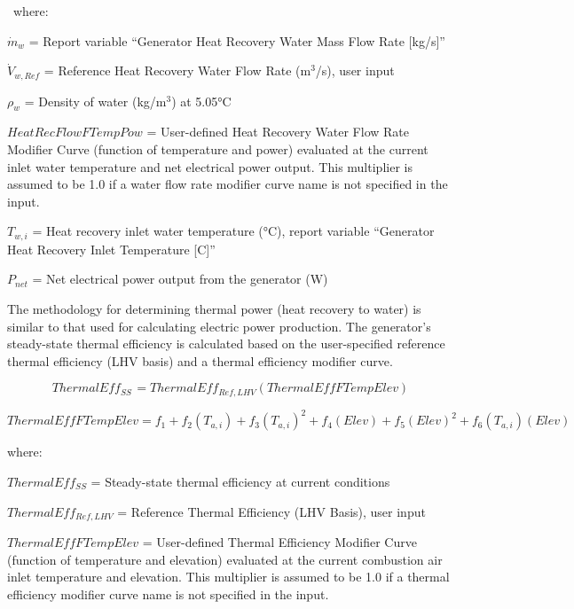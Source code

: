~where:

\({\dot m_w}\) = Report variable ``Generator Heat Recovery Water Mass Flow Rate {[}kg/s{]}''

\({\dot V_{w,Ref}}\) = Reference Heat Recovery Water Flow Rate (m\(^{3}\)/s), user input

\({\rho_w}\) = Density of water (kg/m\(^{3}\)) at 5.05°C

\(HeatRecFlowFTempPow\) = User-defined Heat Recovery Water Flow Rate Modifier Curve (function of temperature and power) evaluated at the current inlet water temperature and net electrical power output. This multiplier is assumed to be 1.0 if a water flow rate modifier curve name is not specified in the input.

\({T_{w,i}}\) = Heat recovery inlet water temperature (°C), report variable ``Generator Heat Recovery Inlet Temperature {[}C{]}''

\({P_{net}}\) = Net electrical power output from the generator (W)

The methodology for determining thermal power (heat recovery to water) is similar to that used for calculating electric power production. The generator's steady-state thermal efficiency is calculated based on the user-specified reference thermal efficiency (LHV basis) and a thermal efficiency modifier curve.

\begin{equation}
ThermalEf{f_{SS\,}} = ThermalEf{f_{Ref,LHV}}\left( {ThermalEffFTempElev} \right)
\end{equation}

\begin{equation}
ThermalEffFTempElev = {f_1} + {f_2}\left( {{T_{a,i}}} \right) + {f_3}{\left( {{T_{a,i}}} \right)^2} + {f_4}\left( {Elev} \right) + {f_5}{\left( {Elev} \right)^2} + {f_6}\left( {{T_{a,i}}} \right)\left( {Elev} \right)
\end{equation}

where:

\(ThermalEf{f_{SS}}\) = Steady-state thermal efficiency at current conditions

\(ThermalEf{f_{Ref,LHV}}\) = Reference Thermal Efficiency (LHV Basis), user input

\(ThermalEffFTempElev\) = User-defined Thermal Efficiency Modifier Curve (function of temperature and elevation) evaluated at the current combustion air inlet temperature and elevation. This multiplier is assumed to be 1.0 if a thermal efficiency modifier curve name is not specified in the input.

